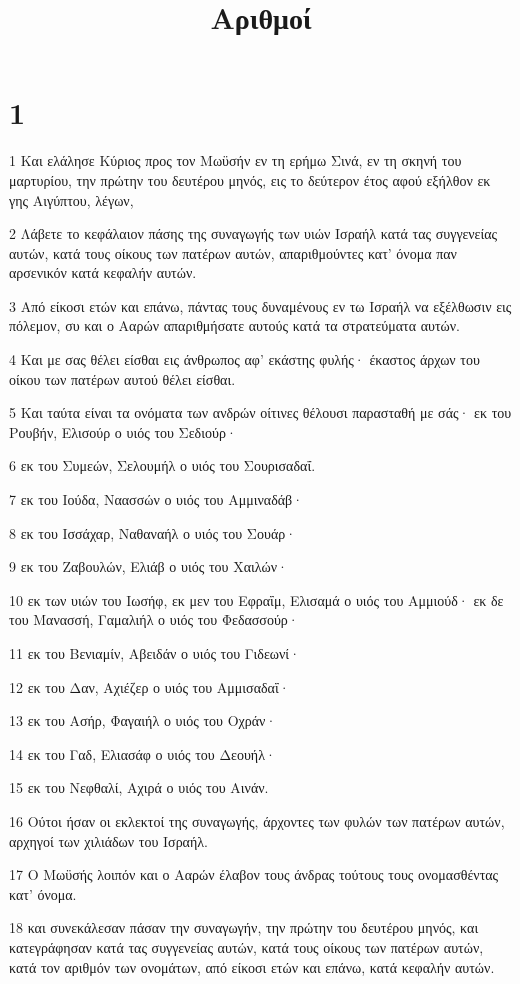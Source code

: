 

\title{Αριθμοί}


\chapter{1}

\par 1 Και ελάλησε Κύριος προς τον Μωϋσήν εν τη ερήμω Σινά, εν τη σκηνή του μαρτυρίου, την πρώτην του δευτέρου μηνός, εις το δεύτερον έτος αφού εξήλθον εκ γης Αιγύπτου, λέγων,
\par 2 Λάβετε το κεφάλαιον πάσης της συναγωγής των υιών Ισραήλ κατά τας συγγενείας αυτών, κατά τους οίκους των πατέρων αυτών, απαριθμούντες κατ' όνομα παν αρσενικόν κατά κεφαλήν αυτών.
\par 3 Από είκοσι ετών και επάνω, πάντας τους δυναμένους εν τω Ισραήλ να εξέλθωσιν εις πόλεμον, συ και ο Ααρών απαριθμήσατε αυτούς κατά τα στρατεύματα αυτών.
\par 4 Και με σας θέλει είσθαι εις άνθρωπος αφ' εκάστης φυλής· έκαστος άρχων του οίκου των πατέρων αυτού θέλει είσθαι.
\par 5 Και ταύτα είναι τα ονόματα των ανδρών οίτινες θέλουσι παρασταθή με σάς· εκ του Ρουβήν, Ελισούρ ο υιός του Σεδιούρ·
\par 6 εκ του Συμεών, Σελουμήλ ο υιός του Σουρισαδαΐ.
\par 7 εκ του Ιούδα, Ναασσών ο υιός του Αμμιναδάβ·
\par 8 εκ του Ισσάχαρ, Ναθαναήλ ο υιός του Σουάρ·
\par 9 εκ του Ζαβουλών, Ελιάβ ο υιός του Χαιλών·
\par 10 εκ των υιών του Ιωσήφ, εκ μεν του Εφραΐμ, Ελισαμά ο υιός του Αμμιούδ· εκ δε του Μανασσή, Γαμαλιήλ ο υιός του Φεδασσούρ·
\par 11 εκ του Βενιαμίν, Αβειδάν ο υιός του Γιδεωνί·
\par 12 εκ του Δαν, Αχιέζερ ο υιός του Αμμισαδαΐ·
\par 13 εκ του Ασήρ, Φαγαιήλ ο υιός του Οχράν·
\par 14 εκ του Γαδ, Ελιασάφ ο υιός του Δεουήλ·
\par 15 εκ του Νεφθαλί, Αχιρά ο υιός του Αινάν.
\par 16 Ούτοι ήσαν οι εκλεκτοί της συναγωγής, άρχοντες των φυλών των πατέρων αυτών, αρχηγοί των χιλιάδων του Ισραήλ.
\par 17 Ο Μωϋσής λοιπόν και ο Ααρών έλαβον τους άνδρας τούτους τους ονομασθέντας κατ' όνομα.
\par 18 και συνεκάλεσαν πάσαν την συναγωγήν, την πρώτην του δευτέρου μηνός, και κατεγράφησαν κατά τας συγγενείας αυτών, κατά τους οίκους των πατέρων αυτών, κατά τον αριθμόν των ονομάτων, από είκοσι ετών και επάνω, κατά κεφαλήν αυτών.
